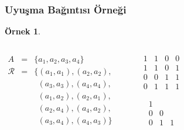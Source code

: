 \documentclass[dvipsnames]{beamer}
\theoremstyle{definition}
\theoremstyle{example}
\newtheorem{ornek}[theorem]{Örnek}
\theoremstyle{plain}
\begin{document}
\begin{frame}
  \frametitle{Uyuşma Bağıntısı Örneği}

  \begin{ornek}
    \begin{columns}
      \begin{eqnarray*}
        A           & = & \{a_1,a_2,a_3,a_4\}\\
        \mathcal{R} & = & \{(a_1,a_1),(a_2,a_2),\\
                    &   & ~~(a_3,a_3),(a_4,a_4),\\
                    &   & ~~(a_1,a_2),(a_2,a_1),\\
                    &   & ~~(a_2,a_4),(a_4,a_2),\\
                    &   & ~~(a_3,a_4),(a_4,a_3)\}
      \end{eqnarray*}

      \begin{center}

        \bigskip
      \end{center}

      \pause
      \begin{center}
        \[
          \begin{array}{|cccc|}
            1  &  1  &  0  &  0\\
            1  &  1  &  0  &  1\\
            0  &  0  &  1  &  1\\
            0  &  1  &  1  &  1
          \end{array}
        \]

        \[
          \begin{array}{|ccc|}
            1  &     & \\
            0  &  0  & \\
            0  &  1  &  1
          \end{array}
        \]
      \end{center}
    \end{columns}
  \end{ornek}
\end{frame}
\end{document}
